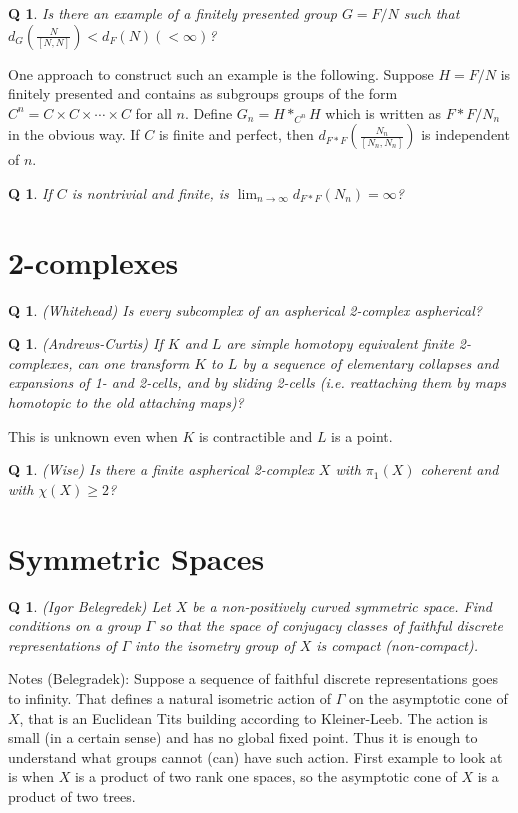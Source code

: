 \documentclass[11pt]{article}
\newtheorem{q}[thm]{Q}
\theoremstyle{remark}
\def\b{\begin{q}}
\def\e{\end{q}}
\newcommand{\<}{\langle}
\renewcommand{\>}{\rangle}
\begin{document}
\b Is there an example of a {\it finitely presented} group $G=F/N$ such that
   $d_G(\frac{N}{[N,N]})<d_F(N)(<\infty)$? \e 
   
   One approach to construct such an example is the following. Suppose $H=F/N$
   is finitely presented and contains as subgroups groups of the form
   $C^n=C\times C\times \cdots\times C$ for all $n$. Define $G_n=H*_{C^n}H$
   which is written as $F*F/N_n$ in the obvious way. If $C$ is finite and
   perfect, then $d_{F*F}(\frac{N_n}{[N_n,N_n]})$ is independent of $n$. 

\b If $C$ is nontrivial and finite, is $\lim_{n\to\infty}d_{F*F}(N_n)=\infty$?
\e 


\section{2-complexes}

\b (Whitehead) Is every subcomplex of an aspherical 2-complex aspherical?\e

\b (Andrews-Curtis) If $K$ and $L$ are simple homotopy equivalent
finite 2-complexes, can one transform $K$ to $L$ by a sequence of elementary
collapses and expansions of 1- and 2-cells, and by sliding 2-cells
(i.e. reattaching them by maps homotopic to the old attaching maps)?\e
This is unknown even when $K$ is contractible and $L$ is a point.

\b
(Wise)
Is there a finite aspherical 2-complex $X$ with $\pi_1(X)$ coherent
and with $\chi(X)\geq 2$?
\e

\section{Symmetric Spaces}


\b (Igor Belegredek)
Let $X$ be a non-positively curved symmetric space.
Find conditions on a group $\Gamma$ so that the space of conjugacy
classes of faithful discrete representations of $\Gamma$
into the isometry group of $X$ is compact (non-compact).\e

Notes (Belegradek): 
Suppose a sequence of faithful discrete representations goes to infinity. 
That defines a natural isometric action of $\Gamma$ on the asymptotic
cone of $X$, that is an Euclidean Tits building according to Kleiner-Leeb.
The action is small (in a certain sense) and has no global fixed point. 
Thus it is enough to understand what groups cannot (can) have such action.
First example to look at is when $X$ is a product of two rank one spaces,
so the asymptotic cone of $X$ is a product of two trees.
\end{document}
